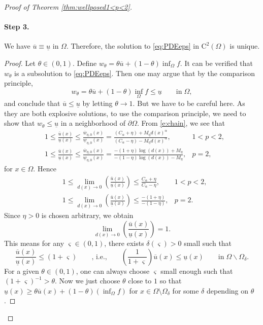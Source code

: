 \documentclass[12pt,reqno]{amsart}
\numberwithin{figure}{section}
\theoremstyle{plain}
\theoremstyle{remark}
\numberwithin{equation}{section}
\begin{document}
\begin{proof} [Proof of Theorem \ref{thm:wellposed1<p<2}]
\paragraph{\textbf{Step 3.}} We have $\overline{u}\equiv \underline{u}$ in $\Omega$. Therefore, the solution to \eqref{eq:PDEeps} in $\mathrm{C}^2(\Omega)$ is unique.

\begin{proof} Let $\theta\in (0,1)$. Define $w_\theta = \theta \overline{u} + (1-\theta) \inf_{\Omega} f$. It can be verified that $w_\theta$ is a subsolution to \eqref{eq:PDEeps}. Then one may argue that by the comparison principle,
\begin{equation*}
    w_\theta = \theta \overline{u} + (1-\theta)\inf_{\Omega} f\leq \underline{u} \qquad\text{in}\;\Omega,
\end{equation*}
and conclude that $\overline{u} \leq \underline{u}$ by letting $\theta\to 1$. But we have to be careful here. As they are both explosive solutions, to use the comparison principle, we need to show that $w_\theta \leq \underline{u}$ in a neighborhood of $\partial\Omega$. From \eqref{e:chain}, we see that
\begin{align*}
    &1\leq \frac{\overline{u}(x)}{\underline{u}(x)} \leq \frac{\overline{w}_{\eta,0}(x)}{\underline{w}_{\eta,0}(x)} = \frac{(C_\alpha+\eta)+ M_\eta d(x)^\alpha}{(C_\alpha-\eta)- M_\eta d(x)^\alpha},& 1<p<2,\\
    &1 \leq \frac{\overline{u}(x)}{\underline{u}(x)} \leq \frac{\overline{w}_{\eta,0}(x)}{\underline{w}_{\eta,0}(x)} = \frac{-(1+\eta)\log(d(x)) + M_\eta}{-(1-\eta)\log(d(x))-M_\eta}, & p=2,
\end{align*}
for $x\in \Omega$. Hence
\begin{align*}
     &1\leq  \lim_{d(x)\to 0} \left(\frac{\overline{u}(x)}{\underline{u}(x)}\right) \leq \frac{C_\alpha+\eta}{C_\alpha-\eta}, & 1< p < 2,\\
     &1\leq  \lim_{d(x)\to 0} \left(\frac{\overline{u}(x)}{\underline{u}(x)}\right) \leq \frac{-(1+\eta)}{-(1-\eta)}, & p = 2.
\end{align*}
Since $\eta>0$ is chosen arbitrary, we obtain
\begin{equation*}
     \lim_{d(x)\to 0} \left(\frac{\overline{u}(x)}{\underline{u}(x)}\right) = 1.
\end{equation*}
 This means for any $\varsigma\in(0,1)$, there exists $\delta(\varsigma)>0$ small such that 
\begin{equation*}
\frac{\overline{u}(x)}{\underline{u}(x)}\leq (1+\varsigma)     \qquad \text{, i.e.,}\qquad \left(\frac{1}{1+\varsigma}\right)\overline{u}(x) \leq \underline{u}(x) \qquad\text{in}\; \Omega\backslash \Omega_\delta.
\end{equation*}
For a given $\theta\in (0,1)$, one can always choose $\varsigma$ small enough such that $(1+\varsigma)^{-1} > \theta$. Now we just choose $\theta$ close to $1$ so that $\underline{u}(x) \geq \theta \overline{u}(x) + (1-\theta)\left(\inf_\Omega f\right)$ for $x \in \Omega \setminus \Omega_\delta$ for some $\delta$ depending on $\theta$.
\end{proof}



\end{proof}
\end{document}
